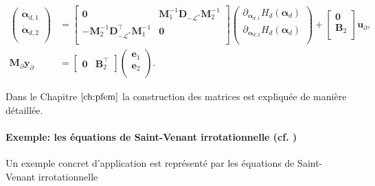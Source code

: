 \begin{equation*}
\begin{aligned}
\begin{pmatrix}
\dot{\bm{\alpha}}_{d, 1} \\
\dot{\bm{\alpha}}_{d, 2} \\
\end{pmatrix}
&= \begin{bmatrix}
\mathbf{0} & \mathbf{M}_1^{-1} \mathbf{D}_{-\mathcal{L}^*} \mathbf{M}_2^{-1}\\
-\mathbf{M}_2^{-1} \mathbf{D}_{-\mathcal{L}^*}^\top \mathbf{M}_1^{-1} & \mathbf{0} \\
\end{bmatrix} 
\begin{pmatrix}
\partial_{\bm{\alpha}_{d, 1}} H_d(\bm{\alpha}_d)\\
\partial_{\bm{\alpha}_{d, 2}} H_d(\bm{\alpha}_d)\\
\end{pmatrix} + 
\begin{bmatrix}
\mathbf{0}\\
\mathbf{B}_2\\
\end{bmatrix}
\mathbf{u}_\partial, \\
\mathbf{M}_\partial {\mathbf{y}_\partial} &= 
\begin{bmatrix}
\mathbf{0} & \mathbf{B}_2^\top 
\end{bmatrix}\begin{pmatrix}
\mathbf{e}_{1} \\
\mathbf{e}_{2} \\
\end{pmatrix}.
\end{aligned}
\end{equation*}

Dans le Chapitre $\ref{ch:pfem}$ la construction des matrices est expliquée de manière détaillée.

\paragraph{Exemple: les équations de Saint-Venant irrotationnelle (cf. )}
Un exemple concret d'application est représenté par les équations de Saint-Venant irrotationnelle 

